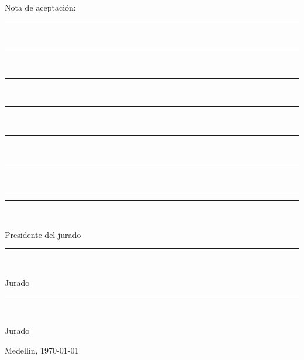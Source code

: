 \thispagestyle{empty}

\begin{flushright}

  \begin{minipage}{.5\textwidth}
    \begin{center}
      {Nota de aceptación:}
    \end{center}
  \end{minipage}
  \rule{.5\textwidth}{.0pt}\\
  \rule{.5\textwidth}{.4pt}\\
  \rule{.5\textwidth}{.4pt}\\
  \rule{.5\textwidth}{.4pt}\\
  \rule{.5\textwidth}{.4pt}\\
  \rule{.5\textwidth}{.4pt}\\
  \rule{.5\textwidth}{.4pt}

  \vspace*{\fill}

  \rule{.5\textwidth}{.4pt}\\
  \begin{minipage}{.5\textwidth}
    \begin{center}
      {Presidente del jurado}
    \end{center}
  \end{minipage}

  \vspace*{\fill}

  \rule{.5\textwidth}{.4pt}\\
  \begin{minipage}{.5\textwidth}
    \begin{center}
      {Jurado}
    \end{center}
  \end{minipage}

  \vspace*{\fill}

  \rule{.5\textwidth}{.4pt}\\
  \begin{minipage}{.5\textwidth}
    \begin{center}
      {Jurado}
    \end{center}
  \end{minipage}

\end{flushright}

\vspace*{\fill}

Medellín, \today

\clearemptydoublepage
